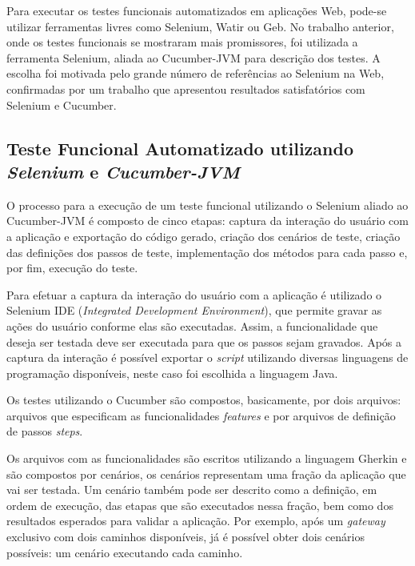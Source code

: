 \documentclass[12pt]{article}
\begin{document}
Para executar os testes funcionais automatizados em aplicações Web, pode-se utilizar ferramentas livres como Selenium\cite{selenium}, Watir\cite{watir} ou Geb\cite{geb}. No trabalho anterior\cite{sbqs2015}, onde os testes funcionais se mostraram mais promissores, foi utilizada a ferramenta Selenium, aliada ao Cucumber-JVM\cite{cucumber} para descrição dos testes. A escolha foi motivada pelo grande número de referências ao Selenium na Web, confirmadas por um trabalho que apresentou resultados satisfatórios com Selenium e Cucumber\cite{pannutest,sbqs2013}.

\subsection{Teste Funcional Automatizado utilizando \emph{Selenium} e \emph{Cucumber-JVM}}
O processo para a execução de um teste funcional utilizando o Selenium aliado ao Cucumber-JVM é composto de cinco etapas: captura da interação do usuário com a aplicação e exportação do código gerado, criação dos cenários de teste, criação das definições dos passos de teste, implementação dos métodos para cada passo e, por fim, execução do teste.

Para efetuar a captura da interação do usuário com a aplicação é utilizado o Selenium IDE (\emph{Integrated Development Environment}), que permite gravar as ações do usuário conforme elas são executadas. Assim, a funcionalidade que deseja ser testada deve ser executada para que os passos sejam gravados. Após a captura da interação é possível exportar o \emph{script} utilizando diversas linguagens de programação disponíveis, neste caso foi escolhida a linguagem Java.

Os testes utilizando o Cucumber são compostos, basicamente, por dois arquivos: arquivos que especificam as funcionalidades \emph{features} e por arquivos de definição de passos \emph{steps}. 

Os arquivos com as funcionalidades são escritos utilizando a linguagem Gherkin\cite{gherkin} e são compostos por cenários, os cenários representam uma fração da aplicação que vai ser testada. Um cenário também pode ser descrito como a definição, em ordem de execução, das etapas que são executados nessa fração, bem como dos resultados esperados para validar a aplicação. Por exemplo, após um \emph{gateway} exclusivo com dois caminhos disponíveis, já é possível obter dois cenários possíveis: um cenário executando cada caminho.
\end{document}
